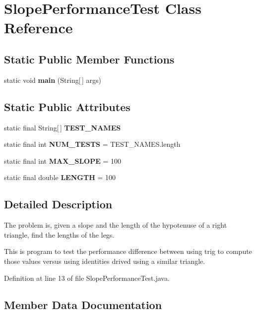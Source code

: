 \section{Slope\-Performance\-Test Class Reference}
\label{classSlopePerformanceTest}
\subsection*{Static Public Member Functions}
\begin{CompactItemize}
\item 
static void {\bf main} (String[$\,$] args)\label{classSlopePerformanceTest_7465b4c09869e56f5c73b6882e684e67}

\end{CompactItemize}
\subsection*{Static Public Attributes}
\begin{CompactItemize}
\item 
static final String[$\,$] {\bf TEST\_\-NAMES}
\item 
static final int {\bf NUM\_\-TESTS} = TEST\_\-NAMES.length\label{classSlopePerformanceTest_0c98962453147d09b482928b04454243}

\item 
static final int {\bf MAX\_\-SLOPE} = 100\label{classSlopePerformanceTest_67b1e43e58ef65b1d03ad6c6c8e812aa}

\item 
static final double {\bf LENGTH} = 100\label{classSlopePerformanceTest_6e54e90a9d2f80c67433e5ca349cf000}

\end{CompactItemize}


\subsection{Detailed Description}
The problem is, given a slope and the length of the hypotenuse of a right triangle, find the lengths of the legs.

This is program to test the performance difference between using trig to compute those values versus using identities drived using a similar triangle. 



Definition at line 13 of file Slope\-Performance\-Test.java.

\subsection{Member Data Documentation}
